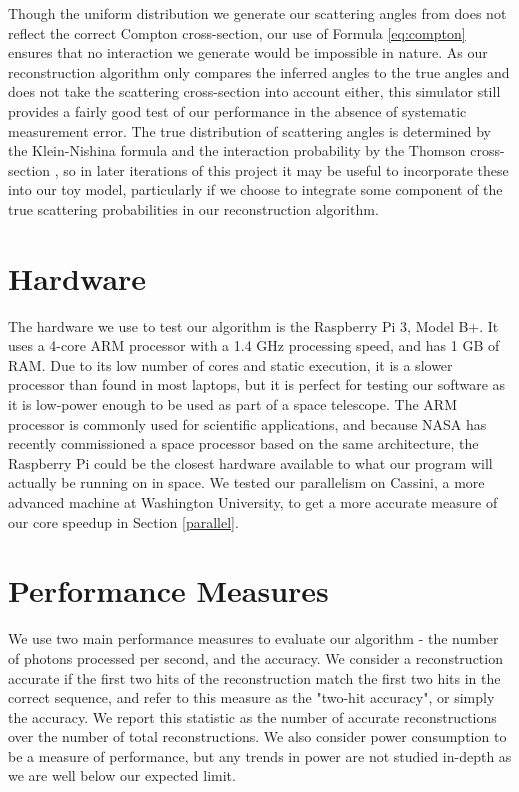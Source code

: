 Though the uniform distribution we generate our scattering angles from does not reflect the correct Compton cross-section, our use of Formula \ref{eq:compton} ensures that no interaction we generate would be impossible in nature. As our reconstruction algorithm only compares the inferred angles to the true angles and does not take the scattering cross-section into account either, this simulator still provides a fairly good test of our performance in the absence of systematic measurement error. The true distribution of scattering angles is determined by the Klein-Nishina formula and the interaction probability by the Thomson cross-section \cite{klein-nishina}, so in later iterations of this project it may be useful to incorporate these into our toy model, particularly if we choose to integrate some component of the true scattering probabilities in our reconstruction algorithm.

\section{Hardware}
The hardware we use to test our algorithm is the Raspberry Pi 3, Model B+. It uses a 4-core ARM processor with a 1.4 GHz processing speed, and has 1 GB of RAM. Due to its low number of cores and static execution, it is a slower processor than found in most laptops, but it is perfect for testing our software as it is low-power enough to be used as part of a space telescope. The ARM processor is commonly used for scientific applications, and because NASA has recently commissioned a space processor based on the same architecture, the Raspberry Pi could be the closest hardware available to what our program will actually be running on in space. We tested our parallelism on Cassini, a more advanced machine at Washington University, to get a more accurate measure of our core speedup in Section \ref{parallel}.

\section{Performance Measures}
We use two main performance measures to evaluate our algorithm - the number of photons processed per second, and the accuracy. We consider a reconstruction accurate if the first two hits of the reconstruction match the first two hits in the correct sequence, and refer to this measure as the "two-hit accuracy", or simply the accuracy. We report this statistic as the number of accurate reconstructions over the number of total reconstructions. We also consider power consumption to be a measure of performance, but any trends in power are not studied in-depth as we are well below our expected limit.

